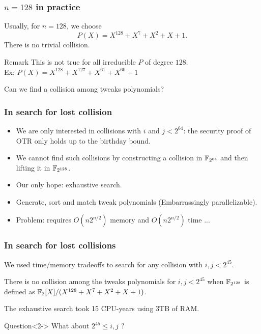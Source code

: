 \documentclass{beamer}
\begin{document}
	\begin{frame}
		\frametitle{$n = 128$ in practice}

		Usually, for $n = 128$, we choose
		\[
			P(X) = X^{128}+X^{7}+X^{2}+X+1.
		\]
		There is no trivial collision. 
		\begin{block}{Remark}
			This is not true for all irreducible $P$ of degree $128$.\\
			Ex: $P(X)=X^{128}+X^{127}+X^{61}+X^{60}+1$
		\end{block}
		
		Can we find a collision among tweaks polynomials?
	\end{frame}

	\begin{frame}
		\frametitle{In search for lost collision}

		\begin{itemize}
			\item We are only interested in collisions with $i$ and $j < 2^{64}$: the security proof of OTR only holds up to the birthday bound.
			
			\item<2-> We cannot find such collisions by constructing a collision in $\mathbb{F}_{2^{64}}$ and then lifting it in $\mathbb{F}_{2^{128}}$.
			
			\item<3-> Our only hope: exhaustive search. 
			
			\item<4-> Generate, sort and match tweak polynomials (Embarrassingly parallelizable).
			
			\item<5-> Problem: requires $O(n 2^{n/2})$ memory and $O(n 2^{n/2})$ time ...
		\end{itemize}
	\end{frame}

	\begin{frame}
		\frametitle{In search for lost collisions}



We used time/memory tradeoffs to search for any collision with $i, j < 2^{45}$.

		\begin{theorem}
			There is no collision among the tweaks polynomials for $i, j < 2^{45}$ when $\mathbb{F}_{2^{128}}$ is defined as $\mathbb{F}_2[X]/(X^{128}+X^{7}+X^{2}+X+1)$.
		\end{theorem}
		
		The exhaustive search took 15 CPU-years using 3TB of RAM.


		\begin{exampleblock}{Question}<2->
			What about $2^{45} \leq i, j$ ?
		\end{exampleblock}
	\end{frame}
\end{document}
